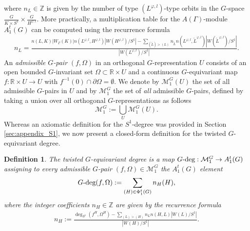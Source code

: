 \documentclass[twoside,11pt]{article}
\def\br{{\mathbb{R}}}
\def\bz{{\mathbb{Z}}}
\def\gdeg{G\text{\rm -deg}}
\def\Om{\Omega}
\newtheorem{definition}[theorem]{Definition}
\begin{document}
where $n_L \in \bz$ is given by the number of type $(L^{\varphi,l})$-type orbits in the $G$-space $\frac{G}{K \times S^1} \times \frac{G}{H^{\varphi,l}}$. More practically,
a multiplication table for the $A(\Gamma)$-module $A_1^t(G)$ can be computed using the recurrence formula
\begin{align} \label{def:recurrence_formula_module_product}
    n_L = \frac{n(L,K)|W_\Gamma(K)|n(L^{\varphi,l},H^{\varphi,l})|W(H^{\varphi,l})/S^1| - \sum_{(\tilde{L}) > (L)} n_{\tilde L} n(L^{\varphi,l},\tilde L^{\varphi,l}) | W(\tilde L^{\varphi,l})/S^1 |}{| W(L^{\varphi,l})/S^1 |}.
\end{align}
An {\it admissible $G$-pair} $(f, \Om)$ in an orthogonal $G$-representation $U$ consists of an open bounded $G$-invariant set $\Om \subset \br \times U$ and a continuous $G$-equivariant map  $f: \br \times U \rightarrow U$ with $f^{-1}(0) \cap \partial \Om = \emptyset$. We denote by $\mathcal M_1^{G}(U)$ the set of all admissible $G$-pairs in $U$ and by $\mathcal M_1^{G}$ the set of {\it all} admissible $G$-pairs, defined by taking a union over all orthogonal $G$-representations as follows 
\[
\mathcal M_1^{G} := \bigcup_{U} \mathcal M_1^{G}(U).
\]
Whereas an axiomatic definition for the $S^1$-degree was provided in Section \ref{sec:appendix_S1}, we now present a closed-form definition for the twisted $G$-equivariant degree.
\begin{definition} \rm
    The {\it twisted $G$-equivariant degree} is a map $\gdeg: \mathcal M_1^G \rightarrow A_1^t(G)$ assigning to every admissible $G$-pair $(f, \Om) \in \mathcal M_1^G$ the $A_1^t(G)$ element
        \[
\gdeg(f,\Om) := \sum\limits_{(H) \in \Phi_1^t(G)} n_H (H),
\]
where the integer coefficients $n_H \in \bz$ are given by the recurrence formula 
\begin{align} \label{def:twisted_degree_recurrence}
n_H := \frac{\deg_{S^1}(f^H,\Om^H) - \sum_{(L)>(H)} n_L n(H,L) | W(L)/S^1|}{|W(H)/S^1|}.    
\end{align}
\end{definition}
\end{document}
